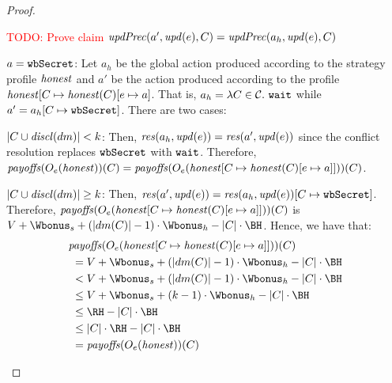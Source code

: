 \begin{proof}
\begin{compactitem}
\begin{compactitem}
\begin{compactitem}
\end{compactitem}

\textcolor{red}{TODO: Prove claim $ \updPrec{a'}{\update{e}}{C} =  \updPrec{a_h}{\update{e}}{C}$}

\item[$a = \wSecret$:]
%
Let $a_h$ be the global action produced according to the strategy profile $\honest$ and $a'$ be the action produced according to the profile $\honest[C \mapsto \honest(C)[e \mapsto a]$.
%
That is, $a_h = \lambda C \in \coalitionSchema.\ \wait$ while $a'= a_h[C \mapsto \wSecret]$.
%
There are two cases:
\begin{compactitem}
\item[$|C \cup \disclosed{dm}| < k$:]
%
Then, $\conflictAction{a_h}{\update{e}} = \conflictAction{a'}{\update{e}}$ since the conflict resolution replaces $\wSecret$ with $\wait$.
%
Therefore, $\payoffs(\subgameOutcome{\honest}{e})(C) = \payoffs(\subgameOutcome{\honest[C \mapsto \honest(C)[e \mapsto a]]}{e})(C)$.


\item[$|C \cup \disclosed{dm}| \geq k$:]	
%
Then, $\conflictAction{a'}{\update{e}} = \conflictAction{a_h}{\update{e}}[C \mapsto \wSecret]$.
%
Therefore,  $\payoffs(\subgameOutcome{\honest[C \mapsto \honest(C)[e \mapsto a]]}{e})(C)$ is $V + \Wbonus_s + (|dm(C)| -1) \cdot \Wbonus_h - |C| \cdot \BH$.
%
Hence, we have that:
	\begin{align*}
			&\payoffs(\subgameOutcome{\honest[C \mapsto \honest(C)[e \mapsto a]]}{e})(C) \\
			&\ = V + \Wbonus_s + (|dm(C)| -1) \cdot \Wbonus_h - |C| \cdot \BH \\  
			&\ <  V + \Wbonus_s + (|dm(C)| -1) \cdot \Wbonus_h - |C| \cdot \BH \\	%
			&\ \leq  V + \Wbonus_s + (k -1) \cdot \Wbonus_h - |C| \cdot \BH \\ %
			&\ \leq  \RH - |C| \cdot \BH \\ %
			&\ \leq |C|  \cdot \RH - |C| \cdot \BH \\ %
			&\ = \payoffs(\subgameOutcome{\honest}{e})(C) %
	\end{align*}
\end{compactitem}
\end{compactitem}
\end{compactitem}
\end{proof}

